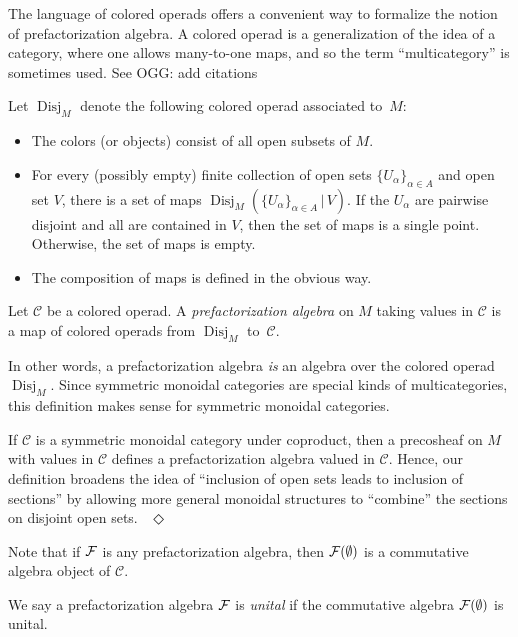\documentclass[11pt]{amsart}
\def\mc{\mathcal}
\def\mcol{\, | \,}
\def\Disj{\operatorname{Disj}}
\def\owen#1{{\textcolor{green!65!black}{OGG: {#1}}}}
\begin{document}
The language of colored operads offers a convenient way to formalize the notion of prefactorization algebra.
A colored operad is a generalization of the idea of a category, where one allows many-to-one maps, and so the term ``multicategory'' is sometimes used. 
See \owen{add citations}

\begin{dfn}
Let $\Disj_M$ denote the following colored operad associated to~$M$: 
\begin{itemize}
\item The colors (or objects) consist of all open subsets of $M$. 
\item For every (possibly empty) finite collection of open sets $\{U_\alpha\}_{\alpha \in A}$ and open set $V$, there is a set of maps $\Disj_M( \{U_\alpha\}_{\alpha \in A} \mcol V)$. If the $U_\alpha$ are pairwise disjoint and all are contained in $V$, then the set of maps is a single point. Otherwise, the set of maps is empty.
\item The composition of maps is defined in the obvious way. 
\end{itemize}
\end{dfn}

\begin{dfn}
Let $\mc{C}$ be a colored operad. 
A \emph{prefactorization algebra}  on $M$ taking values in $\mc{C}$ is a map of colored operads from $\Disj_M$ to~$\mc{C}$. 
\end{dfn}

In other words, a prefactorization algebra \emph{is} an algebra over the colored operad $\Disj_M$.
Since symmetric monoidal categories are special kinds of multicategories, this definition makes sense for symmetric monoidal categories. 

\begin{rmk} 
If $\mc{C}$ is a symmetric monoidal category under coproduct, then a precosheaf on $M$ with values in $\mc{C}$ defines a prefactorization algebra valued in $\mc{C}$. 
Hence, our definition broadens the idea of ``inclusion of open sets leads to inclusion of sections'' by allowing more general monoidal structures to ``combine'' the sections on disjoint open sets.
~\hfill$\Diamond$ 
\end{rmk}

Note that if $\mathcal F$ is any prefactorization algebra, then $\mathcal F(\emptyset)$ is a commutative algebra object of $\mc{C}$. 

\begin{dfn}
We say a prefactorization algebra $\mathcal F$ is \emph{unital} if the commutative algebra $\mathcal F(\emptyset)$ is unital. 
\end{dfn}
\end{document}
